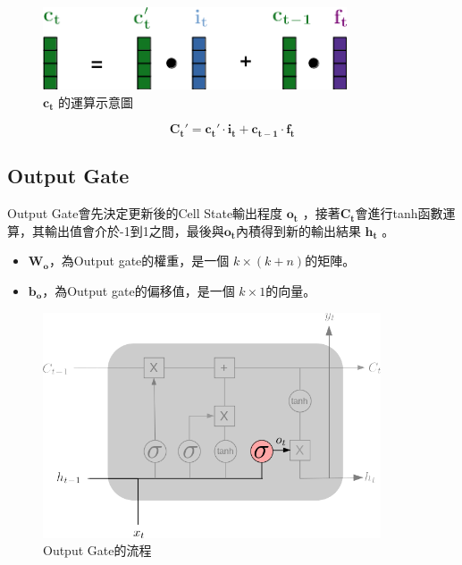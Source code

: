 \begin{figure}[H]
	\centering
	\includegraphics[width=9cm]{./pic/Qff4EdKi.png}
	\caption{\(\mathbf{c_t}\) 的運算示意圖}
	\label{fig:CellStateUpdateCaculate}
\end{figure}

\begin{equation}
	\label{eqn:InputCalculate}
	\mathbf{C_t' = c_t'\cdot i_t + c_{t-1}\cdot f_t} 
\end{equation}



\subsection{Output Gate}

Output Gate會先決定更新後的Cell State輸出程度 \(\mathbf{o_t}\) ，接著\(\mathbf{C_t}\)會進行tanh函數運算，其輸出值會介於-1到1之間，最後與\(\mathbf{o_t}\)內積得到新的輸出結果 \(\mathbf{h_t}\) 。

\begin{itemize}

	\item 
		\(\mathbf{W_o}\)，為Output gate的權重，是一個 \(k \times (k+n)\)的矩陣。

	\item 
		\(\mathbf{b_o}\)，為Output gate的偏移值，是一個 \(k \times 1\)的向量。

\end{itemize}

\begin{figure}[H]
	\centering
	\includegraphics[width=10cm]{./pic/e9dbHfq4.png}
	\caption{Output Gate的流程}
	\label{fig:OutputGate}
\end{figure}


